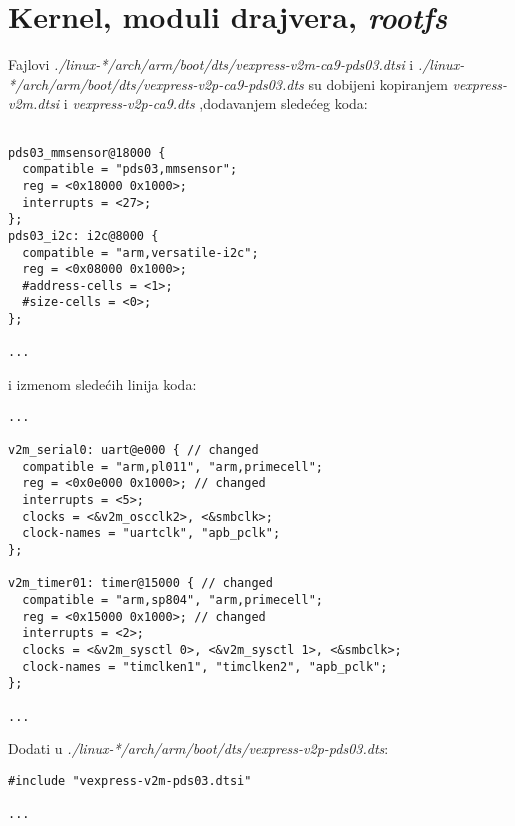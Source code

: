 \documentclass{article}
\begin{document}
\section{Kernel, moduli drajvera, \textit{rootfs}}

Fajlovi \textit{./linux-*/arch/arm/boot/dts/vexpress-v2m-ca9-pds03.dtsi} i \textit{./linux-*/arch/arm/boot/dts/vexpress-v2p-ca9-pds03.dts} su dobijeni kopiranjem \textit{vexpress-v2m.dtsi} i \textit{vexpress-v2p-ca9.dts} ,dodavanjem sledećeg koda: \\

\begin{file}
\begin{verbatim}

pds03_mmsensor@18000 {
  compatible = "pds03,mmsensor";
  reg = <0x18000 0x1000>;
  interrupts = <27>;
};
pds03_i2c: i2c@8000 {
  compatible = "arm,versatile-i2c";
  reg = <0x08000 0x1000>;
  #address-cells = <1>;
  #size-cells = <0>;
};

...
\end{verbatim}
\end{file}

i izmenom sledećih linija koda:

\begin{file}
\begin{verbatim}
...

v2m_serial0: uart@e000 { // changed
  compatible = "arm,pl011", "arm,primecell";
  reg = <0x0e000 0x1000>; // changed
  interrupts = <5>;
  clocks = <&v2m_oscclk2>, <&smbclk>;
  clock-names = "uartclk", "apb_pclk";
};

v2m_timer01: timer@15000 { // changed
  compatible = "arm,sp804", "arm,primecell";
  reg = <0x15000 0x1000>; // changed
  interrupts = <2>;
  clocks = <&v2m_sysctl 0>, <&v2m_sysctl 1>, <&smbclk>;
  clock-names = "timclken1", "timclken2", "apb_pclk";
};

...
\end{verbatim}
\end{file}

Dodati u \textit{./linux-*/arch/arm/boot/dts/vexpress-v2p-pds03.dts}:

\begin{file}
\begin{verbatim}
#include "vexpress-v2m-pds03.dtsi"

...
\end{verbatim}
\end{file}
\end{document}
